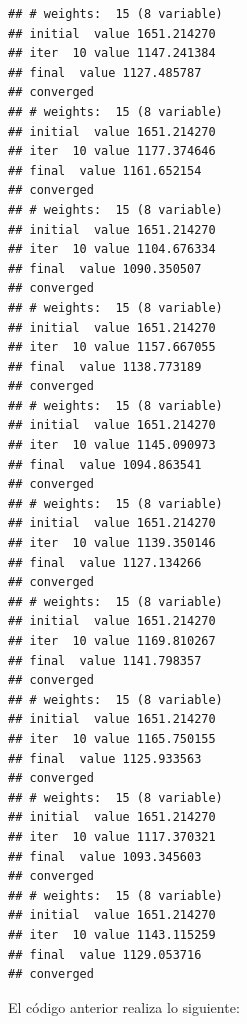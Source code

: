 \documentclass[
  12pt,
]{book}
\begin{document}
\begin{verbatim}
## # weights:  15 (8 variable)
## initial  value 1651.214270 
## iter  10 value 1147.241384
## final  value 1127.485787 
## converged
## # weights:  15 (8 variable)
## initial  value 1651.214270 
## iter  10 value 1177.374646
## final  value 1161.652154 
## converged
## # weights:  15 (8 variable)
## initial  value 1651.214270 
## iter  10 value 1104.676334
## final  value 1090.350507 
## converged
## # weights:  15 (8 variable)
## initial  value 1651.214270 
## iter  10 value 1157.667055
## final  value 1138.773189 
## converged
## # weights:  15 (8 variable)
## initial  value 1651.214270 
## iter  10 value 1145.090973
## final  value 1094.863541 
## converged
## # weights:  15 (8 variable)
## initial  value 1651.214270 
## iter  10 value 1139.350146
## final  value 1127.134266 
## converged
## # weights:  15 (8 variable)
## initial  value 1651.214270 
## iter  10 value 1169.810267
## final  value 1141.798357 
## converged
## # weights:  15 (8 variable)
## initial  value 1651.214270 
## iter  10 value 1165.750155
## final  value 1125.933563 
## converged
## # weights:  15 (8 variable)
## initial  value 1651.214270 
## iter  10 value 1117.370321
## final  value 1093.345603 
## converged
## # weights:  15 (8 variable)
## initial  value 1651.214270 
## iter  10 value 1143.115259
## final  value 1129.053716 
## converged
\end{verbatim}

El código anterior realiza lo siguiente:
\end{document}
